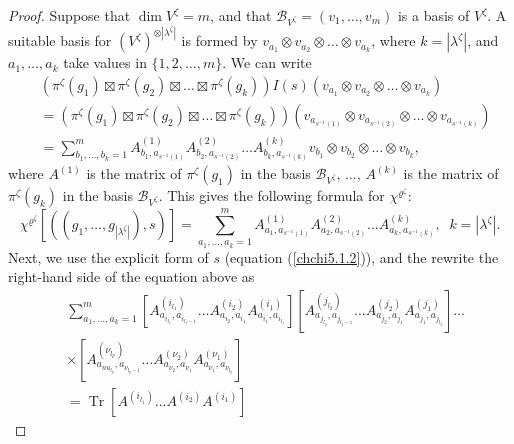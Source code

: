 \documentclass[12pt]{amsart}
\theoremstyle{definition}
\numberwithin{equation}{section}
\DeclareMathOperator{\Tr}{Tr}
\begin{document}
\begin{proof}
Suppose that $\dim V^{\zeta}=m$, and that $\mathcal{B}_{V^{\zeta}}=\left(v_1,\ldots,v_m\right)$
is a basis of $V^{\zeta}$. A suitable basis for $\left(V^{\zeta}\right)^{\otimes|\lambda^{\zeta}|}$
is formed by $v_{a_1}\otimes v_{a_2}\otimes\ldots\otimes v_{a_k}$, where $k=|\lambda^{\zeta}|$, and $a_1,\ldots,a_k$ take values in $\{1,2,\ldots,m\}$. We can write
\begin{equation}
\begin{split}
&\left(\pi^{\zeta}(g_1)\boxtimes\pi^{\zeta}(g_2)\boxtimes\ldots\boxtimes\pi^{\zeta}(g_k)\right)
I(s)\left(v_{a_1}\otimes v_{a_2}\otimes\ldots\otimes v_{a_k}\right)\\
&=\left(\pi^{\zeta}(g_1)\boxtimes\pi^{\zeta}(g_2)\boxtimes\ldots\boxtimes\pi^{\zeta}(g_k)\right)
\left(v_{a_{s^{-1}(1)}}\otimes v_{a_{s^{-1}(2)}}\otimes\ldots\otimes v_{a_{s^{-1}(k)}}\right)\\
&=\sum\limits_{b_1,\ldots,b_k=1}^m
A^{(1)}_{b_1,a_{s^{-1}(1)}}A^{(2)}_{b_2,a_{s^{-1}(2)}}\ldots A^{(k)}_{b_k,a_{s^{-1}(k)}}
v_{b_1}\otimes v_{b_2}\otimes\ldots\otimes v_{b_k},
\end{split}
\end{equation}
where $A^{(1)}$ is the matrix of $\pi^{\zeta}(g_1)$ in the basis $\mathcal{B}_{V^{\zeta}}$,
$\ldots$, $A^{(k)}$ is the matrix of $\pi^{\zeta}(g_k)$ in the basis $\mathcal{B}_{V^{\zeta}}$.
This gives the following formula for $\chi^{\varrho^{\zeta}}$:
\begin{equation}
\chi^{\varrho^{\zeta}}\left[\left((g_1,\ldots,g_{|\lambda^{\zeta}|}),s\right)\right]
=\sum\limits_{a_1,\ldots,a_k=1}^m
A^{(1)}_{a_1,a_{s^{-1}(1)}}A^{(2)}_{a_2,a_{s^{-1}(2)}}\ldots A^{(k)}_{a_k,a_{s^{-1}(k)}},\;\; k=|\lambda^{\zeta}|.
\end{equation}
Next, we use the explicit form of $s$ (equation (\ref{chchi5.1.2})), and the rewrite the right-hand side of the equation above as
\begin{equation}
\begin{split}
&\sum\limits_{a_1,\ldots,a_k=1}^m
\left[A^{(i_{l_1})}_{a_{i_{l_1}},a_{i_{l_1-1}}}\ldots A^{(i_2)}_{a_{i_2},a_{i_1}} A^{(i_1)}_{a_{i_1},a_{i_{l_1}}}\right]
\left[A^{(j_{l_2})}_{a_{j_{l_2}},a_{j_{l_2-1}}}\ldots A^{(j_2)}_{a_{j_2},a_{j_1}} A^{(j_1)}_{a_{j_1},a_{j_{l_2}}}\right]\ldots\\
&\times
\left[A^{(\nu_{l_p})}_{a_{nu_{l_p}},a_{\nu_{l_p-1}}}\ldots A^{(\nu_2)}_{a_{\nu_2},a_{\nu_1}} A^{(\nu_1)}_{a_{\nu_1},a_{\nu_{l_p}}}\right]\\
&=\Tr\left[A^{(i_{l_1})}\ldots A^{(i_2)} A^{(i_1)}\right]

\end{split}
\end{equation}
\end{proof}
\end{document}
